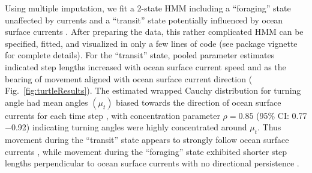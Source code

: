 \documentclass[12pt]{article}\usepackage[]{graphicx}\usepackage[]{color}
\begin{document}
Using multiple imputation, we fit a 2-state HMM including a ``foraging'' state unaffected by currents and a ``transit'' state potentially influenced by ocean surface currents%
. After preparing the data, this rather complicated HMM can be specified, fitted, and visualized in only a few lines of code (see package vignette for complete details). %
For the ``transit'' state, pooled parameter estimates indicated step lengths increased with ocean surface current speed and as the bearing of movement aligned with ocean surface current direction (%
Fig.\ \ref{fig:turtleResults}). The estimated wrapped Cauchy distribution for turning angle had mean angles $(\mu_t)$ 
biased towards the direction of ocean surface currents for each time step%
, with concentration parameter $\rho=0.85$ (95\% CI: 0.77$-$0.92) indicating turning angles were highly concentrated around $\mu_t$. Thus movement during the ``transit'' state appears to strongly follow ocean surface currents%
, while movement during the ``foraging'' state exhibited shorter step lengths %
perpendicular to ocean surface currents %
with no directional persistence%
. %
\end{document}
